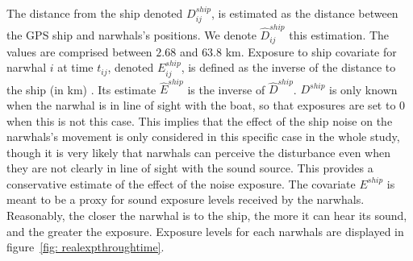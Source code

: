 \documentclass[11pt]{article}
\newcommand {\1}{\mathbb{1}}
\begin{document}

The distance from the ship denoted $D^{ship}_{ij}$, is estimated as the distance between the GPS ship and narwhals's positions. We denote $\hat{D}^{ship}_{ij}$ this estimation. The values are comprised between $2.68$ and $63.8$ km.
Exposure to ship covariate for narwhal $i$ at time $t_{ij}$, denoted $E^{ship}_{ij}$, is defined as the inverse of the distance to the ship (in km) \cite{heide-jorgensen_behavioral_2021}. Its estimate $\hat{E}^{ship}$ is the inverse of $\hat{D}^{ship}$.
$D^{ship}$ is only known when the narwhal is in line of sight with the boat, so that exposures are set to $0$ when this is not this case. This implies that the effect of the ship noise on the narwhals's movement is only considered in this specific case in the whole study, though it is very likely that narwhals can perceive the disturbance even when they are not clearly in line of sight with the sound source. This provides a conservative estimate of the effect of the noise exposure. The covariate $E^{ship}$ is meant to be a proxy for sound exposure levels received by the narwhals. Reasonably, the closer the narwhal is to the ship, the more it can hear its sound, and the greater the exposure. Exposure levels for each narwhals are displayed in figure~\ref{fig: realexpthroughtime}.
\end{document}
